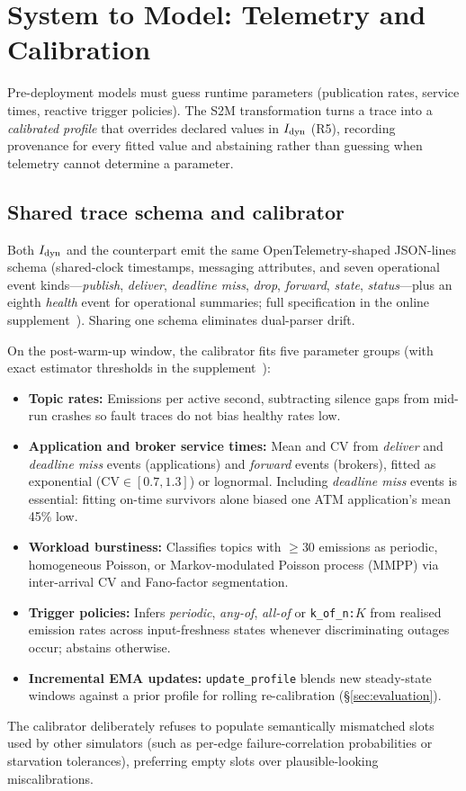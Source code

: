 \section{System to Model: Telemetry and Calibration}
\label{sec:s2m}

Pre-deployment models must guess runtime parameters (publication rates, service times, reactive trigger policies). The S2M transformation turns a trace into a \emph{calibrated profile} that overrides declared values in $I_{\mathrm{dyn}}$ (R5), recording provenance for every fitted value and abstaining rather than guessing when telemetry cannot determine a parameter.

\subsection{Shared trace schema and calibrator}

Both $I_{\mathrm{dyn}}$ and the counterpart emit the same OpenTelemetry-shaped JSON-lines schema (shared-clock timestamps, messaging attributes, and seven operational event kinds---\emph{publish}, \emph{deliver}, \emph{deadline miss}, \emph{drop}, \emph{forward}, \emph{state}, \emph{status}---plus an eighth \emph{health} event for operational summaries; full specification in the online supplement~\citealp{sag-software}). Sharing one schema eliminates dual-parser drift.

On the post-warm-up window, the calibrator fits five parameter groups (with exact estimator thresholds in the supplement~\citealp{sag-software}):
\begin{itemize}[leftmargin=*,nosep]
  \item \textbf{Topic rates:} Emissions per active second, subtracting silence gaps from mid-run crashes so fault traces do not bias healthy rates low.
  \item \textbf{Application and broker service times:} Mean and CV from \emph{deliver} and \emph{deadline miss} events (applications) and \emph{forward} events (brokers), fitted as exponential ($\text{CV} \in [0.7, 1.3]$) or lognormal. Including \emph{deadline miss} events is essential: fitting on-time survivors alone biased one ATM application's mean 45\% low.
  \item \textbf{Workload burstiness:} Classifies topics with $\ge 30$ emissions as periodic, homogeneous Poisson, or Markov-modulated Poisson process (MMPP) via inter-arrival CV and Fano-factor segmentation.
  \item \textbf{Trigger policies:} Infers \emph{periodic}, \emph{any-of}, \emph{all-of} or \texttt{k\_of\_n:$K$} from realised emission rates across input-freshness states whenever discriminating outages occur; abstains otherwise.
  \item \textbf{Incremental EMA updates:} \texttt{update\_profile} blends new steady-state windows against a prior profile for rolling re-calibration (\S\ref{sec:evaluation}).
\end{itemize}
The calibrator deliberately refuses to populate semantically mismatched slots used by other simulators (such as per-edge failure-correlation probabilities or starvation tolerances), preferring empty slots over plausible-looking miscalibrations.

